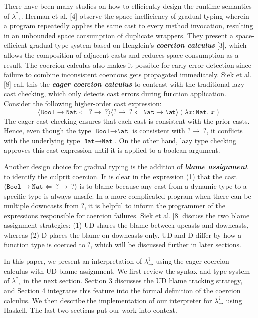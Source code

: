 There have been many studies on how to efficiently design the runtime 
semantics of $\lambda ^? _{\rightarrow}$. Herman et al. [4] observe 
the space inefficiency of gradual typing wherein a program repeatedly applies 
the same cast to every method invocation, resulting in an unbounded space 
consumption of duplicate wrappers. They present a space-efficient gradual 
type system based on Henglein's \textit{\textbf{coercion calculus}} [3], 
which allows the composition of adjacent casts and reduces space consumption 
as a result. The coercion calculus also makes it possible for early error detection 
since failure to combine inconsistent coercions gets propagated 
immediately. Siek et al. [8] call this the \textit{\textbf{eager coercion calculus}} 
to contrast with the traditional lazy cast checking, which only detects cast 
errors during function application. Consider the following higher-order cast 
expression: 
\begin{equation}
    \langle \texttt{Bool} \rightarrow \texttt{Nat} \Leftarrow  
    \: ? \rightarrow \: ? \rangle 
    \langle ? \rightarrow \: ? \Leftarrow 
    \texttt{Nat} \rightarrow \texttt{Nat} \rangle
    (\lambda x \! : \! \texttt{Nat} . \; x)
\end{equation}
The eager cast checking ensures that each cast is consistent with the prior 
casts. Hence, even though the type $\texttt{Bool} \rightarrow \texttt{Nat}$ 
is consistent with $ ? \rightarrow \: ? $, 
it conflicts with the underlying type $\texttt{Nat} \rightarrow \texttt{Nat}$. 
On the other hand, lazy type checking approves this cast expression until 
it is applied to a boolean argument.

Another design choice for gradual typing is the addition of \textit{\textbf{blame assignment}} 
to identify the culprit coercion. It is clear in the expression (1) that the cast 
$\langle \texttt{Bool} \rightarrow \texttt{Nat} \Leftarrow 
\: ? \rightarrow \: ? \rangle$ is to blame because any cast from a 
dynamic type to a specific type is always unsafe. In a more complicated program 
when there can be multiple downcasts from ?, it is helpful to inform 
the programmer of the expressions responsible for coercion failures. Siek et al. [8] 
discuss the two blame assignment strategies: (1) UD shares the blame between 
upcasts and downcasts, whereas (2) D places the blame on downcasts only. UD and D 
differ by how a function type is coerced to ?, which will be discussed 
further in later sections.

In this paper, we present an interpretation of $\lambda ^? _{\rightarrow}$ 
using the eager coercion calculus with UD blame assignment. We first review the syntax 
and type system of $\lambda ^? _{\rightarrow}$ in the next section. 
Section 3 discusses the UD blame tracking strategy, and Section 4 integrates this 
feature into the formal definition of the coercion calculus. We then describe the 
implementation of our interpreter for $\lambda ^? _{\rightarrow}$ using Haskell. 
The last two sections put our work into context.